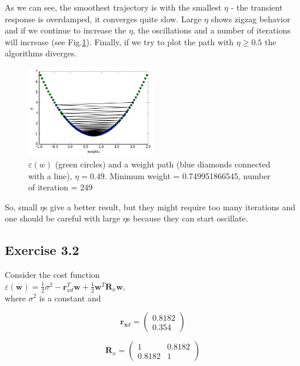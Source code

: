 \documentclass[a4paper, 12pt]{article}
\begin{document}
As we can see, the smoothest trajectory is with the smallest $\eta$ - the transient response is overdamped, it converges quite slow. Large $\eta$ shows zigzag behavior and if we continue to increase the $\eta$, the oscillations and a number of iterations will increase (see Fig.\ref{fig:EFunction049}). Finally, if we try to plot the path with $\eta \geqslant 0.5$ the algorithms diverges.

\begin{figure}[h]
  \centering
  \caption{$\varepsilon(w)$ (green circles) and a weight path (blue diamonds connected with a line), $\eta = 0.49$. Minimum weight = 0.749951866545, number of iteration = 249  \label{fig:EFunction049}}
  \includegraphics[width=0.5\textwidth]{EFunction049}
\end{figure}

So, small $\eta$s give a better result, but they might require too many iterations and one should be careful with large $\eta$s because they can start oscillate.\\

\cleardoublepage	



\subsection{Exercise 3.2}

Consider the cost function\\
$\varepsilon(\boldsymbol{w}) = \frac{1}{2} \sigma^2 - \boldsymbol{\boldsymbol{r}}_{xd}^T\boldsymbol{w} + \frac{1}{2}\boldsymbol{w}^T\boldsymbol{R}_x\boldsymbol{w}$,\\

where $\sigma^2$ is a constant and

\[\boldsymbol{r}_{\boldsymbol{x}d} = \left( \begin{array}{ccc}
0.8182 \\
0.354 \end{array} \right)\]

\[\boldsymbol{R}_x = \left( \begin{array}{ccc}
1 & 0.8182 \\
0.8182  & 1 \end{array} \right)\]
\end{document}
